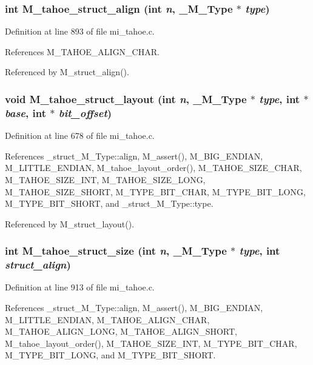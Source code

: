 \subsubsection{\setlength{\rightskip}{0pt plus 5cm}int M\_\-tahoe\_\-struct\_\-align (int {\em n}, \bf{\_\-M\_\-Type} $\ast$ {\em type})}\label{mi__tahoe_8c_4b3f100f176c0f4c0eb97d284f988ffd}




Definition at line 893 of file mi\_\-tahoe.c.

References M\_\-TAHOE\_\-ALIGN\_\-CHAR.

Referenced by M\_\-struct\_\-align().
\subsubsection{\setlength{\rightskip}{0pt plus 5cm}void M\_\-tahoe\_\-struct\_\-layout (int {\em n}, \bf{\_\-M\_\-Type} $\ast$ {\em type}, int $\ast$ {\em base}, int $\ast$ {\em bit\_\-offset})}\label{mi__tahoe_8c_2f5c57da620826d5ee7f5ebe89c52968}




Definition at line 678 of file mi\_\-tahoe.c.

References \_\-struct\_\-M\_\-Type::align, M\_\-assert(), M\_\-BIG\_\-ENDIAN, M\_\-LITTLE\_\-ENDIAN, M\_\-tahoe\_\-layout\_\-order(), M\_\-TAHOE\_\-SIZE\_\-CHAR, M\_\-TAHOE\_\-SIZE\_\-INT, M\_\-TAHOE\_\-SIZE\_\-LONG, M\_\-TAHOE\_\-SIZE\_\-SHORT, M\_\-TYPE\_\-BIT\_\-CHAR, M\_\-TYPE\_\-BIT\_\-LONG, M\_\-TYPE\_\-BIT\_\-SHORT, and \_\-struct\_\-M\_\-Type::type.

Referenced by M\_\-struct\_\-layout().
\subsubsection{\setlength{\rightskip}{0pt plus 5cm}int M\_\-tahoe\_\-struct\_\-size (int {\em n}, \bf{\_\-M\_\-Type} $\ast$ {\em type}, int {\em struct\_\-align})}\label{mi__tahoe_8c_adfbbd15234f02f71059c754902b91cb}




Definition at line 913 of file mi\_\-tahoe.c.

References \_\-struct\_\-M\_\-Type::align, M\_\-assert(), M\_\-BIG\_\-ENDIAN, M\_\-LITTLE\_\-ENDIAN, M\_\-TAHOE\_\-ALIGN\_\-CHAR, M\_\-TAHOE\_\-ALIGN\_\-LONG, M\_\-TAHOE\_\-ALIGN\_\-SHORT, M\_\-tahoe\_\-layout\_\-order(), M\_\-TAHOE\_\-SIZE\_\-INT, M\_\-TYPE\_\-BIT\_\-CHAR, M\_\-TYPE\_\-BIT\_\-LONG, and M\_\-TYPE\_\-BIT\_\-SHORT.

